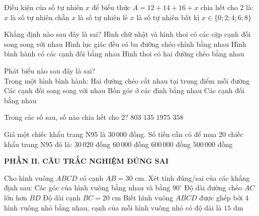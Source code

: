 \documentclass[12pt,a4paper]{article}
\begin{document}
\begin{ex}
Điều kiện của số tự nhiên $x$ để biểu thức $A = 12 + 14 + 16 + x$ chia hết cho 2 là:
\choice
{\True $x$ là số tự nhiên chẵn}
{$x$ là số tự nhiên lẻ}
{$x$ là số tự nhiên bất kì}
{$x \in \{0; 2; 4; 6; 8\}$}
\end{ex}

\begin{ex}
Khẳng định nào sau đây là sai?
\choice
{Hình chữ nhật và hình thoi có các cặp cạnh đối song song với nhau}
{Hình lục giác đều có ba đường chéo chính bằng nhau}
{Hình bình hành có các cạnh đối bằng nhau}
{\True Hình thoi có hai đường chéo bằng nhau}
\end{ex}

\begin{ex}
Phát biểu nào sau đây là sai?\\Trong một hình bình hành:
\choice
{Hai đường chéo cắt nhau tại trung điểm mỗi đường}
{Các cạnh đối song song với nhau}
{\True Bốn góc ở các đỉnh bằng nhau}
{Các cạnh đối bằng nhau}
\end{ex}

\begin{ex}
Trong các số sau, số nào chia hết cho 2?
\choice
{$803$}
{$135$}
{$1975$}
{\True $358$}
\end{ex}

\begin{ex}
Giá một chiếc khẩu trang N95 là $30\,000$ đồng. Số tiền cần có để mua 20 chiếc khẩu trang N95 đó là:
\choice
{$30\,020$ đồng}
{$60\,000$ đồng}
{\True $600\,000$ đồng}
{$500\,000$ đồng}
\end{ex}


\setcounter{ex}{0}
\vspace{2mm}
\noindent\textbf{\large PHẦN II. CÂU TRẮC NGHIỆM ĐÚNG SAI}
\vspace{1mm}
\begin{ex}
Cho hình vuông $ABCD$ có cạnh $AB = 30\text{ cm}$. Xét tính đúng/sai của các khẳng định sau:
\choiceTF
{\True Các góc của hình vuông bằng nhau và bằng $90^\circ$}
{Độ dài đường chéo $AC$ lớn hơn $BD$}
{Độ dài cạnh $BC = 20\text{ cm}$}
{Biết hình vuông $ABCD$ được ghép bởi 4 hình vuông nhỏ bằng nhau, cạnh của mỗi hình vuông nhỏ có độ dài là $15\text{ dm}$}
\end{ex}
\end{document}
